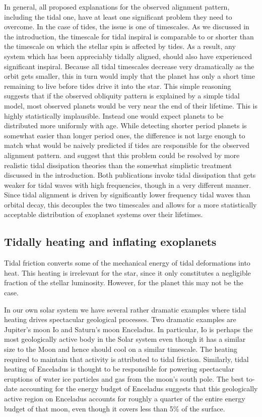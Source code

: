 In general, all proposed explanations for the observed alignment pattern,
including the tidal one, have at least one significant problem they need to
overcome. In the case of tides, the issue is one of timescales. As we discussed
in the introduction, the timescale for tidal inspiral is comparable to or
shorter than the timescale on which the stellar spin is affected by tides. As a
result, any system which has been appreciably tidally aligned, should also have
experienced significant inspiral. Because all tidal timescales decrease very
dramatically as the orbit gets smaller, this in turn would imply that the planet
has only a short time remaining to live before tides drive it into the star.
This simple reasoning suggests that if the observed obliquity pattern is
explained by a simple tidal model, most observed planets would be very near the
end of their lifetime. This is highly statistically implausible. Instead one
would expect planets to be distributed more uniformly with age. While detecting
shorter period planets is somewhat easier than longer period ones, the
difference is not large enough to match what would be naively predicted if tides
are responsible for the observed alignment pattern. \citet{Lai_12} and
\citet{Anderson_et_al_21} suggest that this problem could be resolved by more
realistic tidal dissipation theories than the somewhat simplistic treatment
discussed in the introduction. Both publications invoke tidal dissipation that
gets weaker for tidal waves with high frequencies, though in a very different
manner. Since tidal alignment is driven by significantly lower frequency tidal
waves than orbital decay, this decouples the two timescales and allows for a
more statistically acceptable distribution of exoplanet systems over their
lifetimes.

\subsection{Tidally heating and inflating exoplanets}

Tidal friction converts some of the mechanical energy of tidal deformations into
heat. This heating is irrelevant for the star, since it only constitutes a
negligible fraction of the stellar luminosity. However, for the planet this may
not be the case.

In our own solar system we have several rather dramatic examples where tidal
heating drives spectacular geological processes. Two dramatic examples are
Jupiter's moon Io and Saturn's moon Enceladus. In particular, Io is perhaps the
most geologically active body in the Solar system even though it has a similar
size to the Moon and hence should cool on a similar timescale. The heating
required to maintain that activity is attributed to tidal friction. Similarly,
tidal heating of Enceladus is thought to be responsible for powering spectacular
eruptions of water ice particles and gas from the moon's south pole.  The best
to-date accounting for the energy budget of Enceladus suggests that this
geologically active region on Enceladus accounts for roughly a quarter of the
entire energy budget of that moon, even though it covers less than 5\% of the
surface.

